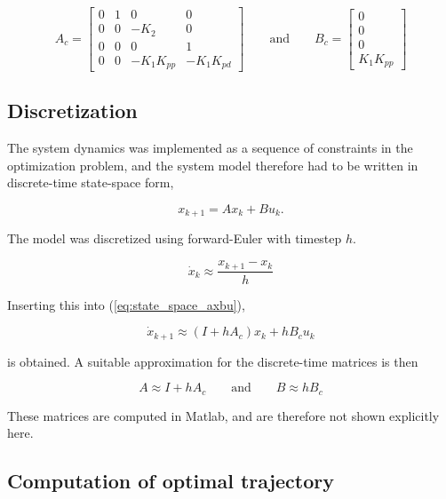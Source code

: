 \begin{equation}
	A_c = \begin{bmatrix} 0 & 1 & 0 & 0 \\ 0 & 0 & -K_2 & 0 \\ 0 & 0 & 0 & 1 \\ 0 & 0 & -K_1K_{pp} & -K_1K_{pd} \end{bmatrix}
	\qquad\text{and}\qquad
	B_c = \begin{bmatrix}0 \\ 0 \\ 0 \\K_1K_{pp} \end{bmatrix}
\end{equation}


\subsection{Discretization}

The system dynamics was implemented as a sequence of constraints in the optimization problem, and the system model therefore had to be written in discrete-time state-space form,

\begin{equation}
	x_{k+1} = Ax_k + Bu_k.
	\label{eq:discrete_state_space_axbu}
\end{equation}

The model was discretized using forward-Euler with timestep $h$.

\begin{equation}
	\dot{x}_k \approx \frac{x_{k+1} - x_k}{h}
\end{equation}

Inserting this into (\ref{eq:state_space_axbu}),

\begin{equation}
	\dot{x}_{k+1} \approx (I + hA_c) x_k + hB_c u_k
\end{equation}

is obtained. A suitable approximation for the discrete-time matrices is then

\begin{equation}
	A \approx I + hA_c
	\qquad\text{and}\qquad
	B \approx hB_c
\end{equation}

These matrices are computed in Matlab, and are therefore not shown explicitly here.


\subsection{Computation of optimal trajectory}

